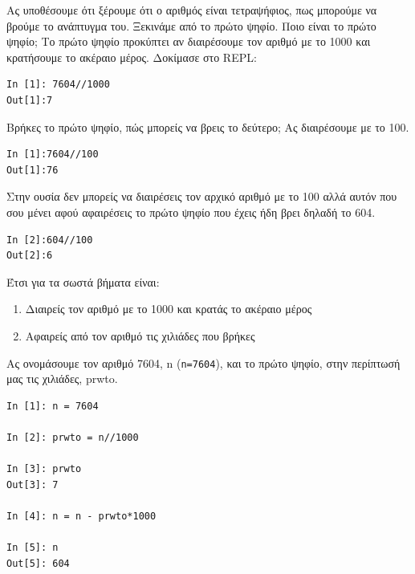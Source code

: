 \documentclass[b5paper,11pt,twoside,openleft]{memoir}
\begin{document}

Ας υποθέσουμε ότι ξέρουμε ότι ο αριθμός είναι τετραψήφιος, πως μπορούμε να βρούμε το ανάπτυγμα του. Ξεκινάμε από το πρώτο ψηφίο. Ποιο είναι το πρώτο ψηφίο; Το πρώτο ψηφίο προκύπτει αν διαιρέσουμε τον αριθμό με το 1000 και κρατήσουμε το ακέραιο μέρος.
Δοκίμασε στο REPL:
\begin{lstlisting}
In [1]: 7604//1000
Out[1]:7
\end{lstlisting}
Βρήκες το πρώτο ψηφίο, πώς μπορείς να βρεις το δεύτερο; Ας διαιρέσουμε με το 100.
\begin{lstlisting}
In [1]:7604//100
Out[1]:76
\end{lstlisting}
Στην ουσία δεν μπορείς να διαιρέσεις τον αρχικό αριθμό με το 100 αλλά αυτόν που σου μένει αφού αφαιρέσεις το πρώτο ψηφίο που έχεις ήδη βρει δηλαδή το 604.
\begin{lstlisting}
In [2]:604//100
Out[2]:6
\end{lstlisting}
Έτσι για τα σωστά βήματα είναι:
\begin{enumerate}
    \item Διαιρείς τον αριθμό με το 1000 και κρατάς το ακέραιο μέρος 
    \item Αφαιρείς από τον αριθμό τις χιλιάδες που βρήκες
\end{enumerate}
Ας ονομάσουμε τον αριθμό 7604, n (\lstinline{n=7604}), και το πρώτο ψηφίο, στην περίπτωσή μας τις χιλιάδες, prwto.
\begin{lstlisting}
In [1]: n = 7604

In [2]: prwto = n//1000

In [3]: prwto
Out[3]: 7

In [4]: n = n - prwto*1000

In [5]: n
Out[5]: 604
\end{lstlisting}
\end{document}
